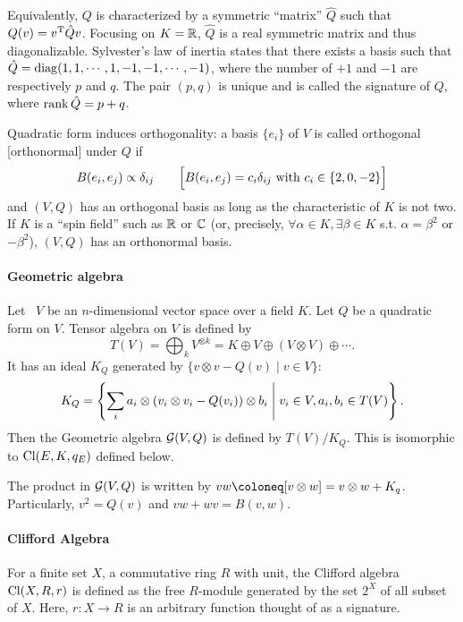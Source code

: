 \documentclass[CheatSheet]{subfiles}
\begin{document}
Equivalently, $Q$ is characterized by a symmetric ``matrix'' $\hat Q$ such that $Q(v)=v^{\mathrm{T}} \hat Q v$.
Focusing on $K={\mathbb{R}}$, $\hat Q$ is a real symmetric matrix and thus diagonalizable. Sylvester's law of inertia states that there exists a basis such that $\hat Q=\operatorname{\mathrm{diag}}(1,1,\cdots,1,-1,-1,\cdots,-1)$, where the number of $+1$ and $-1$ are respectively $p$ and $q$.
The pair $(p,q)$ is unique and is called the signature of $Q$, where $\operatorname{\mathrm{rank}} \hat Q=p+q$.

Quadratic form induces orthogonality: a basis $\{e_i\}$ of $V$ is called orthogonal [orthonormal] under $Q$ if
\begin{equation}
  B(e_i,e_j)\propto \delta_{ij}\qquad\Bigl[B(e_i,e_j)=c_i\delta_{ij}\text{~with~}c_i\in\{2,0,-2\}\Bigr]
\end{equation}
and $(V,Q)$ has an orthogonal basis as long as the characteristic of $K$ is not two.
If $K$ is a ``spin field'' such as ${\mathbb{R}}$ or ${\mathbb{C}}$ (or, precisely, $\forall \alpha\in K,\exists \beta\in K$ s.t. $\alpha=\beta^2$ or $-\beta^2$), $(V,Q)$ has an orthonormal basis.

\paragraph{Geometric algebra}
Let~\cite{0907.5356} $V$ be an $n$-dimensional vector space over a field $K$. Let $Q$ be a quadratic form on $V$.
Tensor algebra on $V$ is defined by
\begin{equation}
  T(V) = \bigoplus_{k} V^{\otimes k}
       = K\oplus V\oplus (V\otimes V)\oplus\cdots.
\end{equation}
It has an ideal $K_Q$ generated by $\{v\otimes v - Q(v)\mid v\in V\}$:
\begin{equation}
  K_Q = \left\{\sum_{i} a_i\otimes(v_i\otimes v_i-Q(v_i))\otimes b_i\mathrel{}\middle|\mathrel{} v_i\in V, a_i,b_i \in T(V)\right\}.
\end{equation}
Then the Geometric algebra $\operatorname{\mathcal{G}}(V,Q)$ is defined by $T(V)/K_Q$. This is isomorphic to $\operatorname{\mathrm{Cl}}(E, K, q_E)$ defined below.

The product in $\operatorname{\mathcal{G}}(V,Q)$ is written by $vw \deq [v\otimes w]=v\otimes w+K_q$. Particularly, $v^2 = Q(v)$ and $vw+wv=B(v,w)$.

\paragraph{Clifford Algebra}
For a finite set $X$, a commutative ring $R$ with unit,
the Clifford algebra $\operatorname{\mathrm{Cl}}(X,R,r)$ is defined as the free $R$-module generated by the set $2^X$ of all subset of $X$.
Here, $r\colon X\to R$ is an arbitrary function thought of as a signature.
\end{document}
